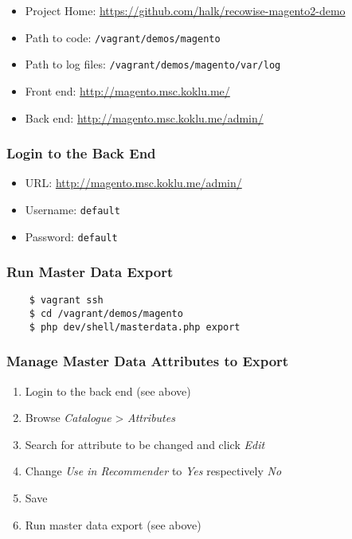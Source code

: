 \begin{itemize}
\item Project Home: \url{https://github.com/halk/recowise-magento2-demo}
\item Path to code: \texttt{/vagrant/demos/magento}
\item Path to log files: \texttt{/vagrant/demos/magento/var/log}
\item Front end: \url{http://magento.msc.koklu.me/}
\item Back end: \url{http://magento.msc.koklu.me/admin/}
\end{itemize}

\subsubsection{Login to the Back End}

\begin{itemize}
\item URL: \url{http://magento.msc.koklu.me/admin/}
\item Username: \texttt{default}
\item Password: \texttt{default}
\end{itemize}

\subsubsection{Run Master Data Export}

\begin{verbatim}
    $ vagrant ssh
    $ cd /vagrant/demos/magento
    $ php dev/shell/masterdata.php export
\end{verbatim}

\subsubsection{Manage Master Data Attributes to Export}

\begin{enumerate}
\item Login to the back end (see above)
\item Browse \emph{Catalogue} > \emph{Attributes}
\item Search for attribute to be changed and click \emph{Edit}
\item Change \emph{Use in Recommender} to \emph{Yes} respectively \emph{No}
\item Save
\item Run master data export (see above)
\end{enumerate}

